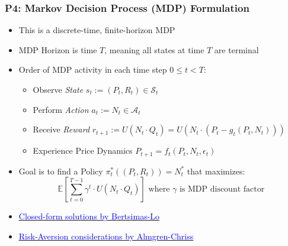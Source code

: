 \documentclass[handout]{beamer}
\begin{document}
\begin{frame}
\frametitle{P4: Markov Decision Process (MDP) Formulation}
\pause
\begin{itemize}[<+->]
\item This is a discrete-time, finite-horizon MDP
\item MDP Horizon is time $T$, meaning all states at time $T$ are terminal
\item Order of MDP activity in each time step $0 \leq t < T$:
\begin{itemize}
\item Observe {\em State} $s_t := (P_t, R_t) \in \mathcal{S}_t$
\item Perform {\em Action} $a_t := N_t \in \mathcal{A}_t$
\item Receive {\em Reward} $r_{t+1} := U(N_t \cdot Q_t) = U(N_t \cdot (P_t - g_t(P_t, N_t)))$
\item Experience Price Dynamics $P_{t+1} = f_t(P_t, N_t, \epsilon_t)$
\end{itemize}
\item Goal is to find a Policy $\pi^*_t((P_t, R_t)) = N_t^*$ that maximizes: $$\mathbb{E}[\sum_{t=0}^{T-1} \gamma^t \cdot U(N_t \cdot Q_t)] \mbox{ where } \gamma \mbox{ is MDP discount factor}$$
\item \href{http://alo.mit.edu/wp-content/uploads/2015/06/Optimal-Control-of-Execution-Costs.pdf}{\underline{\textcolor{blue}{Closed-form solutions by Bertsimas-Lo}}}
\item \href{https://www.math.nyu.edu/faculty/chriss/optliq_f.pdf}{\underline{\textcolor{blue}{Risk-Aversion considerations by Almgren-Chriss}}}
\end{itemize}
\end{frame}
\end{document}
